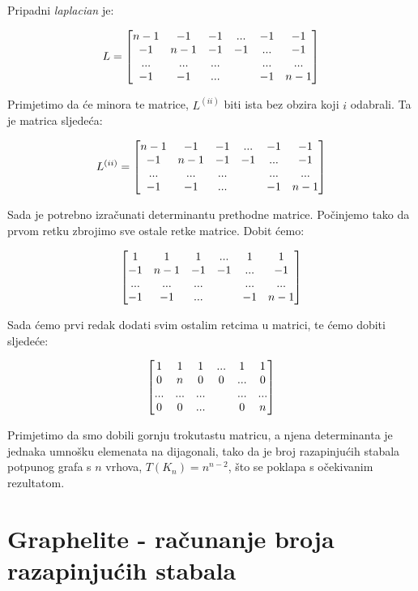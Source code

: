 \documentclass[times, utf8, zavrsni]{fer}
\begin{document}
Pripadni \textit{laplacian} je:

\[
\centering
L = 
\begin{bmatrix}
	n-1 & -1 & -1 & ... & -1 & -1 \\
	-1 & n-1 & -1 & -1 & ... & -1 \\
	... & ... & ... & & ... & ...  \\
	-1 & -1 & ... & & -1 & n-1
\end{bmatrix}
\]

Primjetimo da će minora te matrice, $L^{(ii)}$ biti ista bez obzira koji $i$ odabrali. Ta je matrica sljedeća:

\[
\centering
L^{(ii)} = 
\begin{bmatrix}
	n-1 & -1 & -1 & ... & -1 & -1 \\
	-1 & n-1 & -1 & -1 & ... & -1 \\
	... & ... & ... & & ... & ...  \\
	-1 & -1 & ... & & -1 & n-1
\end{bmatrix}
\]

Sada je potrebno izračunati determinantu prethodne matrice. Počinjemo tako da prvom retku zbrojimo sve ostale retke matrice. Dobit ćemo:

\[
\centering
\begin{bmatrix}
	1 & 1 & 1 & ... & 1 & 1 \\
	-1 & n-1 & -1 & -1 & ... & -1 \\
	... & ... & ... & & ... & ...  \\
	-1 & -1 & ... & & -1 & n-1
\end{bmatrix}
\]

Sada ćemo prvi redak dodati svim ostalim retcima u matrici, te ćemo dobiti sljedeće:

\[
\centering
\begin{bmatrix}
	1 & 1 & 1 & ... & 1 & 1 \\
	0 & n & 0 & 0 & ... & 0 \\
	... & ... & ... & & ... & ...  \\
	0 & 0 & ... & & 0 & n
\end{bmatrix}
\]

Primjetimo da smo dobili gornju trokutastu matricu, a njena determinanta je jednaka umnošku elemenata na dijagonali, tako da je broj razapinjućih stabala potpunog grafa s $n$ vrhova, $T(K_n) = n^{n-2}$, što se poklapa s očekivanim rezultatom.

\chapter{Graphelite - računanje broja razapinjućih stabala}
\end{document}
